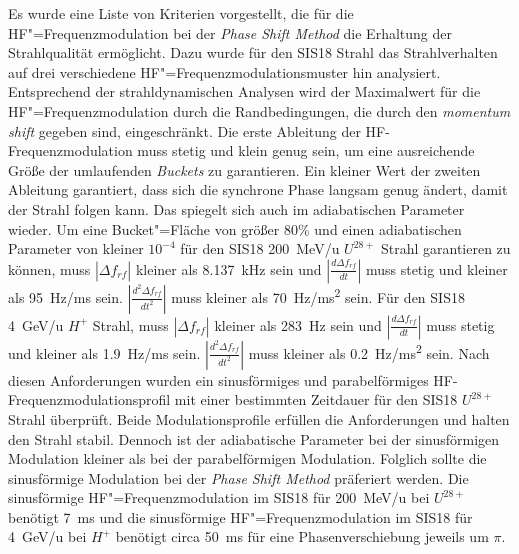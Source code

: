 Es wurde eine Liste von Kriterien vorgestellt, die f\"ur die HF"=Frequenzmodulation bei der \textit{Phase Shift Method} die Erhaltung der Strahlqualit\"at erm\"oglicht. Dazu wurde f\"ur den SIS18 Strahl das Strahlverhalten auf drei verschiedene HF"=Frequenzmodulationsmuster hin analysiert. Entsprechend der strahldynamischen Analysen wird der Maximalwert f\"ur die HF"=Frequenzmodulation durch die Randbedingungen, die durch den \textit{momentum shift} gegeben sind, eingeschr\"ankt. Die erste Ableitung der HF-Frequenzmodulation muss stetig und klein genug sein, um eine ausreichende Gr\"oße der umlaufenden \textit{Buckets}  zu garantieren. Ein kleiner Wert der zweiten Ableitung garantiert,  dass sich die synchrone Phase langsam genug ändert, damit der Strahl folgen kann. Das spiegelt sich auch im adiabatischen Parameter wieder. Um eine Bucket"=Fl\"ache von größer 80$\%$  und einen adiabatischen Parameter von kleiner $10^{-4}$ f\"ur den SIS18 \SI{200}{MeV/u} $U^\mathit{28+}$ Strahl garantieren zu k\"onnen, muss $|\Delta f_{\mathit{rf}}|$ kleiner als \SI{8.137}{kHz} sein und $|\frac{d\Delta f_{\mathit{rf}}}{dt}|$ muss stetig und kleiner als \SI{95}{Hz/ms} sein. $|\frac{d^2\Delta f_{\mathit{rf}}}{dt^2}|$ muss kleiner als \SI{70}{Hz/ms^2} sein. Für den SIS18 \SI{4}{GeV/u} $H^{+}$ Strahl, muss $|\Delta f_{\mathit{rf}}|$ kleiner als \SI{283}{Hz} sein und $|\frac{d\Delta f_{\mathit{rf}}}{dt}|$ muss stetig und kleiner als \SI{1.9}{Hz/ms} sein. $|\frac{d^2\Delta f_{\mathit{rf}}}{dt^2}|$ muss kleiner als \SI{0.2}{Hz/ms^2} sein. Nach diesen Anforderungen wurden ein sinusförmiges und parabelförmiges HF-Frequenzmodulationsprofil mit einer bestimmten Zeitdauer f\"ur den SIS18 $U^{28+}$ Strahl \"uberpr\"uft. Beide Modulationsprofile erfüllen die Anforderungen und halten den Strahl stabil. Dennoch ist der adiabatische Parameter bei der sinusf\"ormigen Modulation kleiner als bei der parabelförmigen Modulation. Folglich sollte die sinusförmige Modulation bei der \textit{Phase Shift Method} pr\"aferiert werden. Die sinusf\"ormige HF"=Frequenzmodulation im SIS18 f\"ur
\SI{200}{MeV/u} bei $U^\mathit{28+}$ ben\"otigt \SI{7}{\ms} und die sinusf\"ormige HF"=Frequenzmodulation im SIS18 f\"ur \SI{4}{GeV/u} bei $H^+$ ben\"otigt circa \SI{50}{\ms} f\"ur eine Phasenverschiebung jeweils um $\pi$.   

